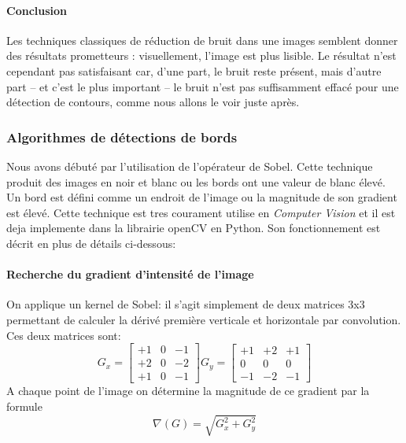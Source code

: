 \documentclass[a4paper, 12pt, titlepage, oneside, french]{article}
\begin{document}
	\newpage
	\paragraph{\textbf{Conclusion}}
	Les techniques classiques de réduction de bruit dans une images semblent donner des résultats prometteurs : visuellement, l'image est plus lisible. Le résultat n'est cependant pas satisfaisant car, d'une part, le bruit reste présent, mais d'autre part -- et c'est le plus important -- le bruit n'est pas suffisamment effacé pour une détection de contours, comme nous allons le voir juste après.

	\newpage

	\subsubsection{Algorithmes de détections de bords}
	Nous avons débuté par l'utilisation de l'opérateur de Sobel\cite{SobelOp}. Cette technique produit des images en noir et blanc ou les bords ont une valeur de blanc élevé. Un bord est défini comme un endroit de l'image ou la magnitude de son gradient est élevé. Cette technique est tres courament utilise en \textit{Computer Vision} et il est deja implemente dans la librairie openCV en Python. Son fonctionnement est décrit en plus de détails ci-dessous: 
		\paragraph{\textbf{Recherche du gradient d'intensité de l'image}}
				On applique un kernel de Sobel: il s'agit simplement de deux matrices 3x3 permettant de calculer la dérivé première verticale et horizontale par convolution. Ces deux matrices sont:
				\\ \[G_x = \begin{bmatrix}  +1  & 0 & -1 \\ +2 & 0 & -2  \\ +1 &  0 & -1\end{bmatrix} 
					G_y = \begin{bmatrix} +1 & +2 & +1  \\  0 & 0 &  0  \\ -1 & -2 & -1\end{bmatrix}\]
						A chaque point de l'image on détermine la magnitude de ce gradient par la formule
					\[\nabla(G) = \sqrt{G_x^2 + G_y^2}\]
\end{document}
